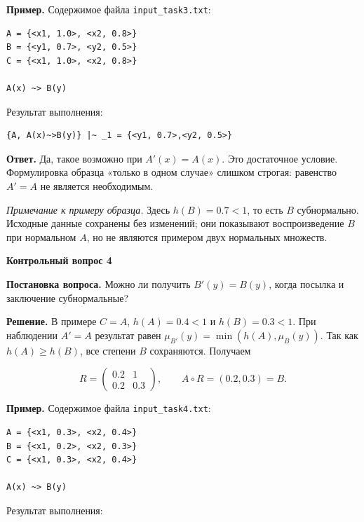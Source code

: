 \documentclass[14pt,a4paper]{extarticle}
\newcommand{\reportheading}[1]{\par\vspace{0.8\baselineskip}\noindent\textbf{#1}\par\nobreak\vspace{0.35\baselineskip}\nobreak}
\begin{document}
\noindent\textbf{Пример.} Содержимое файла \texttt{input\_task3.txt}:

\begin{Verbatim}[fontsize=\small,baselinestretch=1,frame=single,breaklines=true]
A = {<x1, 1.0>, <x2, 0.8>}
B = {<y1, 0.7>, <y2, 0.5>}
C = {<x1, 1.0>, <x2, 0.8>}

A(x) ~> B(y)
\end{Verbatim}

\noindent Результат выполнения:

\begin{Verbatim}[fontsize=\small,baselinestretch=1,frame=single,breaklines=true]
{A, A(x)~>B(y)} |~ _1 = {<y1, 0.7>,<y2, 0.5>}
\end{Verbatim}

\smallskip\noindent\textbf{Ответ.} Да, такое возможно при $A'(x)=A(x)$. Это достаточное условие. Формулировка образца «только в одном случае» слишком строгая: равенство $A'=A$ не является необходимым.\par\smallskip\noindent\textit{Примечание к примеру образца.} Здесь $h(B)=0.7<1$, то есть $B$ субнормально. Исходные данные сохранены без изменений; они показывают воспроизведение $B$ при нормальном $A$, но не являются примером двух нормальных множеств.


\clearpage
\reportheading{Контрольный вопрос 4}

\noindent\textbf{Постановка вопроса.} Можно ли получить $B'(y)=B(y)$, когда посылка и заключение субнормальные?

\smallskip\noindent\textbf{Решение.} В примере $C=A$, $h(A)=0.4<1$ и $h(B)=0.3<1$. При наблюдении $A'=A$ результат равен $\mu_{B'}(y)=\min(h(A),\mu_B(y))$. Так как $h(A)\geq h(B)$, все степени $B$ сохраняются. Получаем

\[
R=\begin{pmatrix}0.2&1\\0.2&0.3\end{pmatrix},\qquad A\circ R=(0.2,0.3)=B.
\]

\noindent\textbf{Пример.} Содержимое файла \texttt{input\_task4.txt}:

\begin{Verbatim}[fontsize=\small,baselinestretch=1,frame=single,breaklines=true]
A = {<x1, 0.3>, <x2, 0.4>}
B = {<x1, 0.2>, <x2, 0.3>}
C = {<x1, 0.3>, <x2, 0.4>}

A(x) ~> B(y)
\end{Verbatim}

\noindent Результат выполнения:
\end{document}
